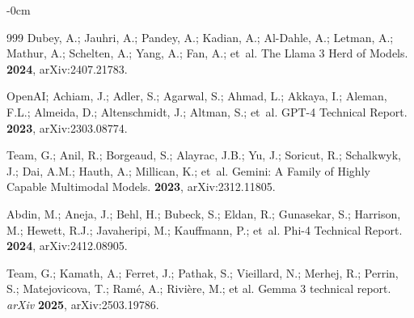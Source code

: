 \documentclass[make,article,accept,pdftex,moreauthors]{Definitions/mdpi}
\begin{document}
\begin{adjustwidth}{-\extralength}{0cm}
\begin{thebibliography}{999}
Dubey, A.; Jauhri, A.; Pandey, A.; Kadian, A.; Al-Dahle, A.; Letman, A.;
  Mathur, A.; Schelten, A.; Yang, A.; Fan, A.;  et~al.
\newblock The Llama 3 Herd of Models.
 {\bf 2024}, arXiv:2407.21783.

OpenAI; Achiam, J.; Adler, S.; Agarwal, S.; Ahmad, L.; Akkaya, I.; Aleman,
  F.L.; Almeida, D.; Altenschmidt, J.; Altman, S.;  et~al.
\newblock GPT-4 Technical Report.
 {\bf 2023}, arXiv:2303.08774.

Team, G.; Anil, R.; Borgeaud, S.; Alayrac, J.B.; Yu, J.; Soricut, R.;
  Schalkwyk, J.; Dai, A.M.; Hauth, A.; Millican, K.;  et~al.
\newblock Gemini: A Family of Highly Capable Multimodal Models.
 {\bf 2023}, arXiv:2312.11805.

Abdin, M.; Aneja, J.; Behl, H.; Bubeck, S.; Eldan, R.; Gunasekar, S.; Harrison,
  M.; Hewett, R.J.; Javaheripi, M.; Kauffmann, P.;  et~al.
\newblock Phi-4 Technical Report.
 {\bf 2024}, arXiv:2412.08905.

Team, G.; Kamath, A.; Ferret, J.; Pathak, S.; Vieillard, N.; Merhej, R.; Perrin, S.; Matejovicova, T.; Ramé, A.; Rivière, M.; et al.
\newblock Gemma 3 technical report. \emph{arXiv} {\bf 2025}, arXiv:2503.19786.



\end{thebibliography}
\end{adjustwidth}
\end{document}
